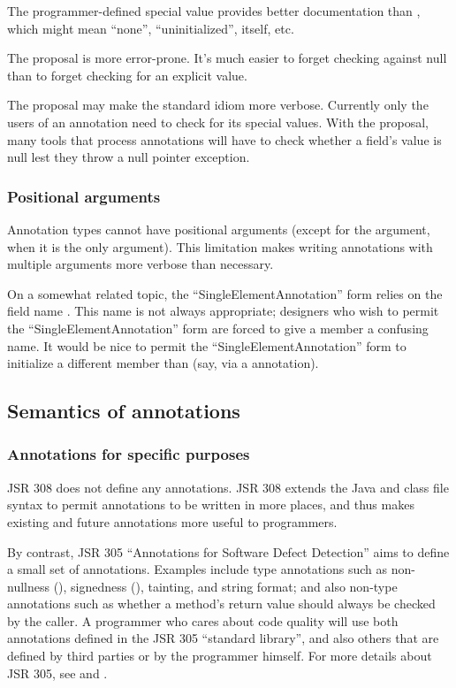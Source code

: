 \documentclass[10pt]{article}
\begin{document}
The programmer-defined special value provides better documentation than
, which might mean ``none'', ``uninitialized'', 
itself, etc.

The proposal is more error-prone.  It's much easier to forget checking
against null than to forget checking for an explicit value.

The proposal may make the standard idiom more verbose.  Currently only the
users of an annotation need to check for its special values.  With the
proposal, many tools that process annotations will have to check whether a
field's value is null lest they throw a null pointer exception.


\subsubsection{Positional arguments}

Annotation types cannot have positional arguments (except for the
 argument, when it is the only argument).  This limitation
makes writing annotations with multiple arguments more verbose than
necessary.

On a somewhat related topic, the ``SingleElementAnnotation'' form relies on
the field name .  This name is not always appropriate;
designers who wish to permit the ``SingleElementAnnotation'' form are
forced to give a member a confusing name.  It would be nice to permit the
``SingleElementAnnotation'' form to initialize a different member than
 (say, via a  annotation).


\subsection{Semantics of annotations\label{semantics}}

\subsubsection{Annotations for specific purposes}

JSR 308 does not define any annotations.
JSR 308 extends the Java and class file syntax to permit
annotations to be written in more places, and thus makes existing and
future annotations more useful to programmers.

By contrast, JSR 305 ``Annotations for Software Defect Detection'' aims to
define a small set of annotations.
Examples include type annotations such as non-nullness
(), signedness (), tainting, and string
format; and also non-type annotations such as whether a method's return
value should always be checked by the caller.
A programmer who cares about code quality will use both annotations
defined in the JSR 305 ``standard library'', and also others that are
defined by third parties or by the programmer himself.
For more details about JSR 305, see
 and
.
\end{document}
